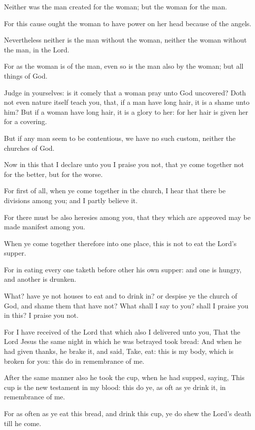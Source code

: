 \verse Neither was the man created for the woman; but the woman for the man.

\verse For this cause ought the woman to have power on her head because of the angels.

\verse Nevertheless neither is the man without the woman, neither the woman without the man, in the Lord.

\verse For as the woman is of the man, even so is the man also by the woman; but all things of God.

\verse Judge in yourselves: is it comely that a woman pray unto God uncovered?  \verse Doth not even nature itself teach you, that, if a man have long hair, it is a shame unto him?  \verse But if a woman have long hair, it is a glory to her: for her hair is given her for a covering.

\verse But if any man seem to be contentious, we have no such custom, neither the churches of God.

\verse Now in this that I declare unto you I praise you not, that ye come together not for the better, but for the worse.

\verse For first of all, when ye come together in the church, I hear that there be divisions among you; and I partly believe it.

\verse For there must be also heresies among you, that they which are approved may be made manifest among you.

\verse When ye come together therefore into one place, this is not to eat the Lord's supper.

\verse For in eating every one taketh before other his own supper: and one is hungry, and another is drunken.

\verse What? have ye not houses to eat and to drink in? or despise ye the church of God, and shame them that have not? What shall I say to you? shall I praise you in this? I praise you not.

\verse For I have received of the Lord that which also I delivered unto you, That the Lord Jesus the same night in which he was betrayed took bread: \verse And when he had given thanks, he brake it, and said, Take, eat: this is my body, which is broken for you: this do in remembrance of me.

\verse After the same manner also he took the cup, when he had supped, saying, This cup is the new testament in my blood: this do ye, as oft as ye drink it, in remembrance of me.

\verse For as often as ye eat this bread, and drink this cup, ye do shew the Lord's death till he come.

